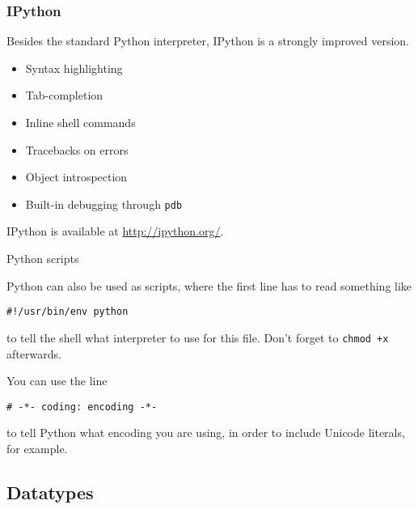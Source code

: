 \documentclass[xetex,10pt]{beamer}
\def\spacer{\vspace*{1em}}
\begin{document}
\begin{frame}[fragile]
	\frametitle{IPython}
	
	Besides the standard Python interpreter, IPython is a strongly improved version.

	\spacer

	\begin{itemize}
		\item Syntax highlighting
		\item Tab-completion
		\item Inline shell commands
		\item Tracebacks on errors
		\item Object introspection
		\item Built-in debugging through \verb!pdb!
	\end{itemize}
	
	\spacer
	IPython is available at \url{http://ipython.org/}.
	
\end{frame}

\begin{frame}[fragile]{Python scripts}
	
	Python can also be used as scripts, where the first line has to read something like
	
\begin{verbatim}
#!/usr/bin/env python
\end{verbatim}
	
	to tell the shell what interpreter to use for this file. Don't forget to \verb!chmod +x! afterwards.\\

	\pause
	\spacer

	You can use the line

\begin{verbatim}
# -*- coding: encoding -*-
\end{verbatim}

	to tell Python what encoding you are using, in order to include Unicode literals, for example.

\end{frame}

\subsection{Datatypes}
\end{document}
